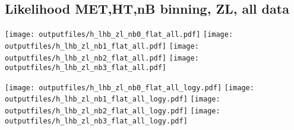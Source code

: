 \documentclass[11pt]{article}
\begin{document}
   \clearpage

    \subsection{ Likelihood MET,HT,nB binning, ZL, all data}

    \noindent
     \texttt{[image: outputfiles/h\_lhb\_zl\_nb0\_flat\_all.pdf]}
     \texttt{[image: outputfiles/h\_lhb\_zl\_nb1\_flat\_all.pdf]}
     \texttt{[image: outputfiles/h\_lhb\_zl\_nb2\_flat\_all.pdf]}
     \texttt{[image: outputfiles/h\_lhb\_zl\_nb3\_flat\_all.pdf]}

    \noindent
     \texttt{[image: outputfiles/h\_lhb\_zl\_nb0\_flat\_all\_logy.pdf]}
     \texttt{[image: outputfiles/h\_lhb\_zl\_nb1\_flat\_all\_logy.pdf]}
     \texttt{[image: outputfiles/h\_lhb\_zl\_nb2\_flat\_all\_logy.pdf]}
     \texttt{[image: outputfiles/h\_lhb\_zl\_nb3\_flat\_all\_logy.pdf]}

   \clearpage





\end{document}
